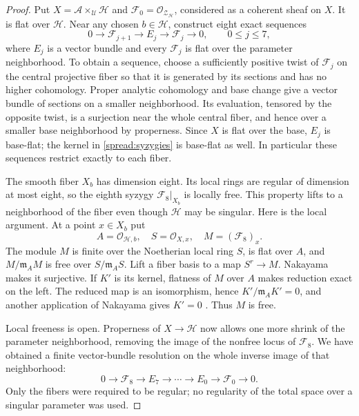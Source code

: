 \begin{proof}
Put $X=\mathscr A\times_{\mathcal U}\mathcal H$ and
$\mathcal F_0=\mathcal O_{\mathscr Z_{\mathcal H}}$, considered as a
coherent sheaf on $X$.  It is flat over $\mathcal H$.  Near any chosen
$b\in\mathcal H$, construct eight exact sequences
\begin{equation}
 0\longrightarrow\mathcal F_{j+1}\longrightarrow E_j
   \longrightarrow\mathcal F_j\longrightarrow0,
 \qquad 0\le j\le7,
 \label{spread:syzygies}
\end{equation}
where $E_j$ is a vector bundle and every $\mathcal F_j$ is flat over
the parameter neighborhood.  To obtain a sequence, choose a sufficiently
positive twist of $\mathcal F_j$ on the central projective fiber so that
it is generated by its sections and has no higher cohomology.  Proper
analytic cohomology and base change give a vector bundle of sections
on a smaller neighborhood.  Its evaluation, tensored by the opposite
twist, is a surjection near the whole central fiber, and hence over
a smaller base neighborhood by properness.  Since $X$ is flat over
the base, $E_j$ is base-flat; the kernel in \eqref{spread:syzygies}
is base-flat as well.  In particular these sequences restrict exactly
to each fiber.

The smooth fiber $X_b$ has dimension eight.  Its local rings are regular
of dimension at most eight, so the eighth syzygy
$\mathcal F_8|_{X_b}$ is locally free.  This property lifts to a
neighborhood of the fiber even though $\mathcal H$ may be singular.
Here is the local argument.  At a point $x\in X_b$ put
\[
 A=\mathcal O_{\mathcal H,b},\quad
 S=\mathcal O_{X,x},\quad M=(\mathcal F_8)_x.
\]
The module $M$ is finite over the Noetherian local ring $S$, is flat
over $A$, and $M/\mathfrak m_A M$ is free over
$S/\mathfrak m_A S$.  Lift a fiber basis to a map $S^r\to M$.
Nakayama makes it surjective.  If $K'$ is its kernel, flatness of $M$
over $A$ makes reduction exact on the left.  The reduced map is an
isomorphism, hence $K'/\mathfrak m_A K'=0$, and another application
of Nakayama gives $K'=0$ \cite{stacks-flat-free}.  Thus $M$ is free.

Local freeness is open.  Properness of $X\to\mathcal H$ now allows one
more shrink of the parameter neighborhood, removing the image of the
nonfree locus of $\mathcal F_8$.  We have obtained a finite vector-bundle
resolution on the whole inverse image of that neighborhood:
\begin{equation}
 0\longrightarrow\mathcal F_8\longrightarrow E_7\longrightarrow
 \cdots\longrightarrow E_0\longrightarrow\mathcal F_0
 \longrightarrow0.
 \label{spread:relative-resolution}
\end{equation}
Only the fibers were required to be regular; no regularity of the total
space over a singular parameter was used.


\end{proof}
